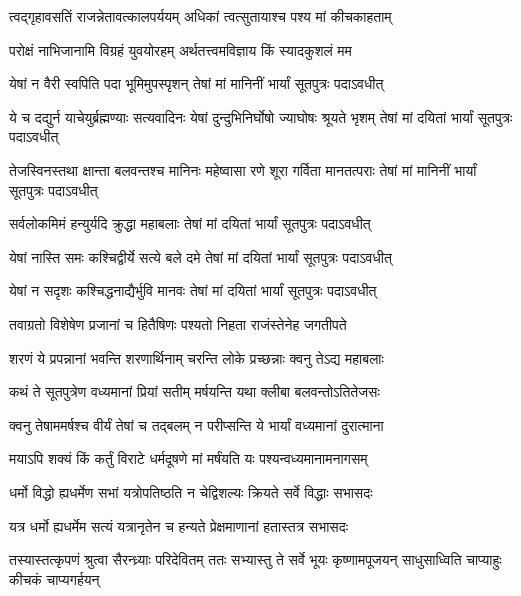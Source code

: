 \twolineshloka
{त्वद्गृहावसतिं राजन्नेतावत्कालपर्ययम्}
{अधिकां त्वत्सुतायाश्च पश्य मां कीचकाहताम्}




\twolineshloka
{परोक्षं नाभिजानामि विग्रहं युवयोरहम्}
{अर्थतत्त्वमविज्ञाय किं स्यादकुशलं मम}




\twolineshloka
{येषां न वैरी स्वपिति पदा भूमिमुपस्पृशन्}
{तेषां मां मानिनीं भार्यां सूतपुत्रः पदाऽवधीत्}


\threelineshloka
{ये च दद्युर्न याचेयुर्ब्रह्मण्याः सत्यवादिनः}
{येषां दुन्दुभिनिर्घोषो ज्याघोषः श्रूयते भृशम्}
{तेषां मां दयितां भार्यां सूतपुत्रः पदाऽवधीत्}


\threelineshloka
{तेजस्विनस्तथा क्षान्ता बलवन्तश्च मानिनः}
{महेष्वासा रणे शूरा गर्विता मानतत्पराः}
{तेषां मां मानिनीं भार्यां सूतपुत्रः पदाऽवधीत्}


\twolineshloka
{सर्वलोकमिमं हन्युर्यदि क्रुद्धा महाबलाः}
{तेषां मां दयितां भार्यां सूतपुत्रः पदाऽवधीत्}


\twolineshloka
{येषां नास्ति समः कश्चिद्वीर्ये सत्ये बले दमे}
{तेषां मां दयितां भार्यां सूतपुत्रः पदाऽवधीत्}


\twolineshloka
{येषां न सदृशः कश्चिद्धनाद्यैर्भुवि मानवः}
{तेषां मां दयितां भार्यां सूतपुत्रः पदाऽवधीत्}


\twolineshloka
{तवाग्रतो विशेषेण प्रजानां च हितैषिणः}
{पश्यतो निहता राजंस्तेनेह जगतीपते}


\twolineshloka
{शरणं ये प्रपन्नानां भवन्ति शरणार्थिनाम्}
{चरन्ति लोके प्रच्छन्नाः क्वनु तेऽद्य महाबलाः}


\twolineshloka
{कथं ते सूतपुत्रेण वध्यमानां प्रियां सतीम्}
{मर्षयन्ति यथा क्लीबा बलवन्तोऽतितेजसः}


\twolineshloka
{क्वनु तेषाममर्षश्च वीर्यं तेषां च तद्बलम्}
{न परीप्सन्ति ये भार्यां वध्यमानां दुरात्माना}


\twolineshloka
{मयाऽपि शक्यं किं कर्तुं विराटे धर्मदूषणे}
{मां मर्षंयति यः पश्यन्वध्यमानामनागसम्}


\twolineshloka
{धर्मो विद्धो ह्यधर्मेण सभां यत्रोपतिष्ठति}
{न चेद्विशल्यः क्रियते सर्वे विद्धाः सभासदः}


\twolineshloka
{यत्र धर्मो ह्यधर्मेम सत्यं यत्रानृतेन च}
{हन्यते प्रेक्षमाणानां हतास्तत्र सभासदः}



\threelineshloka
{तस्यास्तत्कृपणं श्रुत्वा सैरन्ध्र्याः परिदेवितम्}
{ततः सभ्यास्तु ते सर्वे भूयः कृष्णामपूजयन्}
{साधुसाध्विति चाप्याहुः कीचकं चाप्यगर्हयन्}


